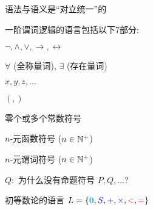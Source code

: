 
\begin{frame}{}
  \begin{center}

    \vspace{0.60cm}
    语法与语义是``对立统一''的
  \end{center}
\end{frame}

\begin{frame}{}
  \begin{definition}[命题逻辑的语言]
    一阶谓词逻辑的语言包括以下7部分: \\[5pt]
    \begin{description}
      \setlength{\itemsep}{5pt}
      \item [逻辑联词:] $\lnot, \land, \lor, \to, \leftrightarrow$
      \item [\red{量词符号:}] $\forall$ (全称量词), $\exists$ (存在量词)
      \item [变元符号:] $x, y, z, \dots$
      \item [左右括号:] $(, )$
      \item [\cyan{常数符号:}] 零个或多个常数符号
      \item [\blue{函数符号:}] $n$-元函数符号 ($n \in \mathbb{N}^{+}$)
      \item [\red{谓词符号:}] $n$-元谓词符号 ($n \in \mathbb{N}^{+}$)
    \end{description}
  \end{definition}

  \pause
  \begin{center}
    $Q:$ 为什么没有命题符号 $P, Q, \dots$?
  \end{center}
\end{frame}

\begin{frame}{}
  \begin{center}
    初等数论的语言 $L = \{\textbf{\textcolor{cyan}{0}},
      \textcolor{blue}{S}, \textcolor{blue}{+}, \textcolor{blue}{\times}, \textcolor{red}{<}, \textcolor{red}{=}\}$
  \end{center}
\end{frame}

